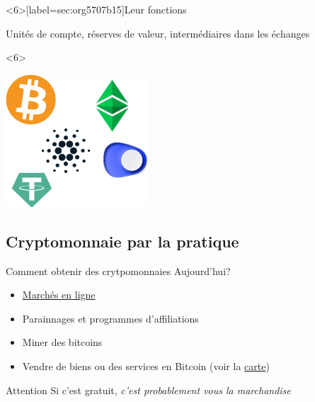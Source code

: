 \documentclass[presentation]{beamer}
\begin{document}
\begin{frame}<6>[label={sec:org5707b15}]{Leur fonctions}
\begin{block}{}
Unités de compte, réserves de valeur, intermédiaires dans les échanges
\end{block}
\begin{block}<6>{}
\begin{center}
\includegraphics[width=.5\textwidth]{./Pictures/logos/tokens_tous.png}
\end{center}
\end{block}
\end{frame}


\subsection{Cryptomonnaie par la pratique}
\label{sec:org0f2e54d}
\begin{frame}[label={sec:org4fc68da}]{Comment obtenir des crytpomonnaies Aujourd'hui?}
\begin{block}{}
\begin{itemize}
\item \href{https://bitcoin.fr/acheter-bitcoin/}{Marchés en ligne}
\item Parainnages et programmes d’affiliations
\item Miner des bitcoins
\item Vendre de biens ou des services en Bitcoin (voir la \href{https://coinmap.org/view/\#/world/32.99023556/10.98632813/4}{carte})
\end{itemize}
\end{block}
\begin{block}{Attention}
\alert{Si c'est gratuit}, \emph{c'est probablement vous la marchandise}
\end{block}
\end{frame}
\end{document}
